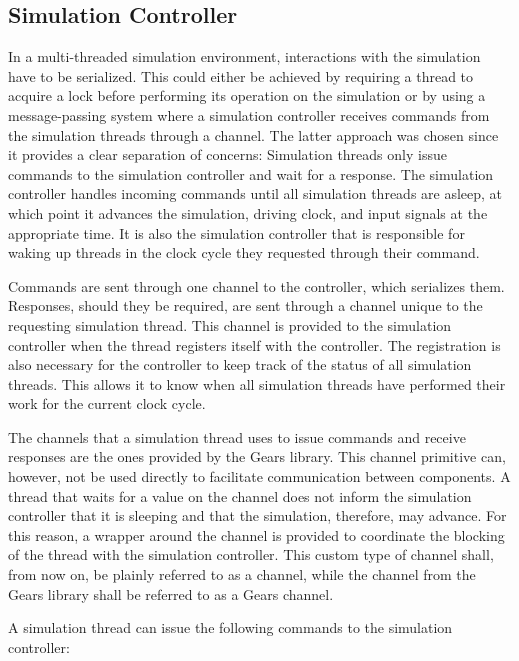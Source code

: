 \subsection{Simulation Controller} %

In a multi-threaded simulation environment, interactions with the simulation have to be serialized. This could either
be achieved by requiring a thread to acquire a lock before performing its operation on the simulation or by
using a message-passing system where a simulation controller receives commands from the simulation
threads through a channel. The latter approach was chosen since it provides a clear separation of concerns:
Simulation threads only issue commands to the simulation controller and wait for a response. The simulation
controller handles incoming commands until all simulation threads are asleep, at which point it advances the
simulation, driving clock, and input signals at the appropriate time. It is also the simulation controller that is
responsible for waking up threads in the clock cycle they requested through their  command.

Commands are sent through one channel to the controller, which serializes them. Responses, should they be required,
are sent through a channel unique to the requesting simulation thread. This channel is provided to the simulation
controller when the thread registers itself with the controller. The registration is also necessary for the
controller to keep track of the status of all simulation threads. This allows it to know when all simulation threads
have performed their work for the current clock cycle.

The channels that a simulation thread uses to issue commands and receive responses are the ones provided by the
Gears library. This channel primitive can, however, not be used directly to facilitate communication between
components. A thread that waits for a value on the channel does not inform the simulation controller that it is
sleeping and that the simulation, therefore, may advance. For this reason, a wrapper around the channel is provided
to coordinate the blocking of the thread with the simulation controller. This custom type of channel shall, from
now on, be plainly referred to as a channel, while the channel from the Gears library shall be referred to as a Gears channel.

A simulation thread can issue the following commands to the simulation controller:

